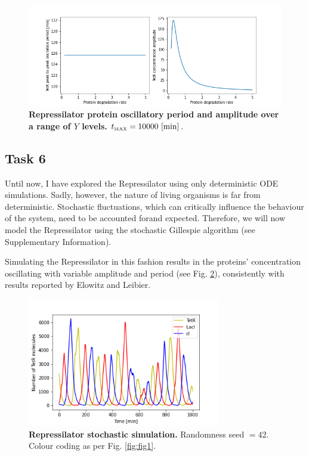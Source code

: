 \documentclass[runningheads,a4paper]{llncs}
\begin{document}
\begin{figure}
    \singlespacing
    \centering
    \includegraphics[width=1\textwidth,trim={1.5cm 0 1.5cm 0},clip]{suplementary_information_and_code/Task5_figure4.png}
    \caption{\textbf{Repressilator protein oscillatory period and amplitude over a range of $Y$ levels.} $t_{\textrm{\tiny MAX}} = 10 000\ [\textrm{min}]$.}
    \label{fig:fig16}
\end{figure}

\clearpage
\subsection*{Task 6}
Until now, I have explored the Repressilator using only deterministic ODE simulations. Sadly, however, the nature of living organisms is far from deterministic. Stochastic fluctuations, which can critically influence the behaviour of the system, need to be accounted for\linebreak and expected. Therefore, we will now model the Repressilator using the stochastic Gillespie algorithm (see Supplementary Information).

Simulating the Repressilator in this fashion results in the proteins' concentration oscillating with variable amplitude and period (see Fig. \ref{fig:fig17}), consistently with results reported by Elowitz and Leibier\cite{Elowitz2000d}.

\begin{figure}
    \singlespacing
    \centering
    \includegraphics[width=0.75\textwidth]{suplementary_information_and_code/Task6_figure1.png}
    \caption{\textbf{Repressilator stochastic simulation.} Randomness seed $= 42$. Colour coding as per Fig. \ref{fig:fig1}.}
    \label{fig:fig17}
\end{figure}
\end{document}
